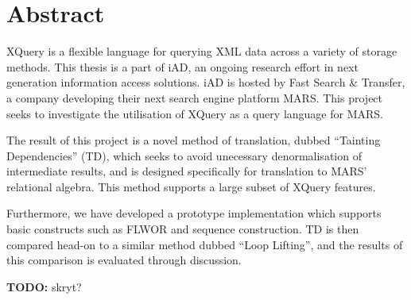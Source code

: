 \chapter*{Abstract}
XQuery is a flexible language for querying XML data across a variety of storage
methods. This thesis is a part of iAD, an ongoing research effort in
next generation information access solutions. iAD is hosted by Fast Search \&
Transfer, a company developing their next search engine platform
MARS. This project seeks to investigate the utilisation of XQuery as a query
language for MARS.

The result of this project is a novel method of translation, dubbed ``Tainting
Dependencies'' (TD), which seeks to avoid unecessary
denormalisation of intermediate results, and is designed specifically
for translation to MARS' relational algebra. This method supports a large subset of XQuery features.

Furthermore, we have developed a prototype implementation which supports basic
constructs such as FLWOR and sequence construction. TD is
then compared head-on to a similar method dubbed ``Loop Lifting'', and the
results of this comparison is evaluated through discussion.

\textbf{\LARGE TODO:} skryt?

% 
